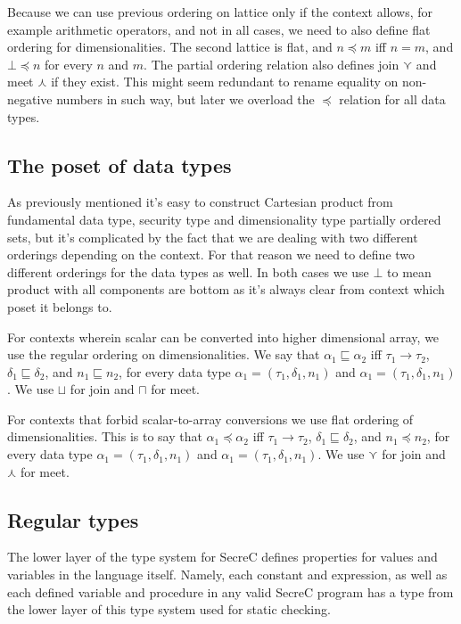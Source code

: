 \documentclass[a4paper, 10pt, draft]{report}
\begin{document}
Because we can use previous ordering on lattice only if the context allows, for
example arithmetic operators, and not in all cases, we need to also define flat
ordering for dimensionalities. The second lattice is flat, and $n \preceq m$
iff $n = m$, and $\bot \preceq n$ for every $n$ and $m$. The partial ordering
relation also defines join $\curlyvee$ and meet $\curlywedge$ if they exist. This might
seem redundant to rename equality on non-negative numbers in such way, but
later we overload the $\preceq$ relation for all data types.

\subsection{The poset of data types}

As previously mentioned it's easy to construct Cartesian product from
fundamental data type, security type and dimensionality type partially ordered
sets, but it's complicated by the fact that we are dealing with two different
orderings depending on the context. For that reason we need to define two
different orderings for the data types as well.  In both cases we use $\bot$ to
mean product with all components are bottom as it's always clear from context
which poset it belongs to.

For contexts wherein scalar can be converted into higher dimensional array, we
use the regular ordering on dimensionalities. We say that $\alpha_1 \sqsubseteq
\alpha_2$ iff $\tau_1 \to \tau_2$,  $\delta_1 \sqsubseteq \delta_2$, and $n_1
\sqsubseteq n_2$, for every data type $\alpha_1 = \left( \tau_1, \delta_1, n_1
\right)$ and $\alpha_1 = \left( \tau_1, \delta_1, n_1 \right)$. We use $\sqcup$
for join and $\sqcap$ for meet.

For contexts that forbid scalar-to-array conversions we use flat ordering of
dimensionalities. This is to say that $\alpha_1 \preceq \alpha_2$ iff $\tau_1
\to \tau_2$,  $\delta_1 \sqsubseteq \delta_2$, and $n_1 \preceq n_2$, for every
data type $\alpha_1 = \left( \tau_1, \delta_1, n_1 \right)$ and $\alpha_1 =
\left( \tau_1, \delta_1, n_1 \right)$. We use $\curlyvee$ for join and
$\curlywedge$ for meet.



\subsection{Regular types}

The lower layer of the type system for SecreC defines properties for values and
variables in the language itself. Namely, each constant and expression, as well
as each defined variable and procedure in any valid SecreC program has a type
from the lower layer of this type system used for static checking.
\end{document}
